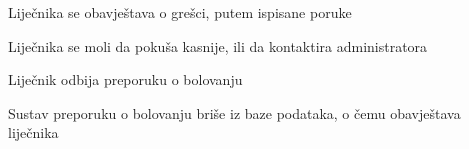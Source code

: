 \begin{packed_item}
\begin{packed_item}
\begin{packed_enum}
								\item Liječnika se obavještava o grešci, putem ispisane poruke
								\item Liječnika se moli da pokuša kasnije, ili da kontaktira administratora
								
							\end{packed_enum}
							\item[4.b] Liječnik odbija preporuku o bolovanju
							\item[] \begin{packed_enum}
								
								\item Sustav preporuku o bolovanju briše iz baze podataka, o čemu obavještava liječnika
								
							\end{packed_enum}
						\end{packed_item}
					\end{packed_item}
					

